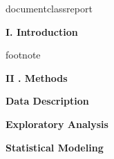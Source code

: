 documentclass{report}

\usepackage{graphicx,amsmath,enumerate, amssymb, multirow, anysize, booktabs, threeparttable, amsfonts, bbm, varioref, pdfpages, float, subcaption, setspace, hyperref}

\usepackage[a4paper]{geometry}

\usepackage{fancyhdr}

\pagestyle{fancy}
\fancyhf{}
\rhead{} %
\lhead{} %

\makeatletter
\def\@makechapterhead#1{%
  \vspace*{0\p@}%
  {\parindent \z@ \raggedright \normalfont
    \interlinepenalty\@M
    \Huge\bfseries  \thechapter.\quad #1\par\nobreak
    \vskip 25\p@
  }}
\makeatother



\usepackage{Sweave}



\begin{titlepage}
    \vspace*{\fill}
    \begin{center}
     
    
    \end{center}
    \vspace*{\fill}
    
\end{titlepage}





\newpage
{\centering\textbf{\Large I. Introduction}\\[0.5cm]}

footnote{\url{}}  %
\bigskip

\bigskip

{\centering\textbf{\Large II . Methods}\\[0.5cm]}

  \textbf{Data Description}
  \bigskip
  
  
  
  \bigskip
 \textbf{Exploratory Analysis}
  \bigskip

  
  
\bigskip  
  \textbf{Statistical Modeling}
  \bigskip
  

